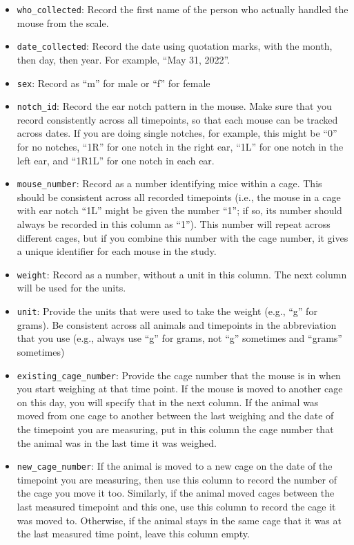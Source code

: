 \documentclass[
]{book}
\providecommand{\tightlist}{%
  \setlength{\itemsep}{0pt}\setlength{\parskip}{0pt}}
\begin{document}
\begin{itemize}
\tightlist
\item
  \texttt{who\_collected}: Record the first name of the person who actually handled the mouse from the scale.
\item
  \texttt{date\_collected}: Record the date using quotation marks, with the month, then day, then year. For example, ``May 31, 2022''.
\item
  \texttt{sex}: Record as ``m'' for male or ``f'' for female
\item
  \texttt{notch\_id}: Record the ear notch pattern in the mouse. Make sure that you record consistently across all timepoints, so that each mouse can be tracked across dates. If you are doing single notches, for example, this might be ``0'' for no notches, ``1R'' for one notch in the right ear, ``1L'' for one notch in the left ear, and ``1R1L'' for one notch in each ear.
\item
  \texttt{mouse\_number}: Record as a number identifying mice within a cage. This should be consistent across all recorded timepoints (i.e., the mouse in a cage with ear notch ``1L'' might be given the number ``1''; if so, its number should always be recorded in this column as ``1''). This number will repeat across different cages, but if you combine this number with the cage number, it gives a unique identifier for each mouse in the study.
\item
  \texttt{weight}: Record as a number, without a unit in this column. The next column will be used for the units.\\
\item
  \texttt{unit}: Provide the units that were used to take the weight (e.g., ``g'' for grams). Be consistent across all animals and timepoints in the abbreviation that you use (e.g., always use ``g'' for grams, not ``g'' sometimes and ``grams'' sometimes)
\item
  \texttt{existing\_cage\_number}: Provide the cage number that the mouse is in when you start weighing at that time point. If the mouse is moved to another cage on this day, you will specify that in the next column. If the animal was moved from one cage to another between the last weighing and the date of the timepoint you are measuring, put in this column the cage number that the animal was in the last time it was weighed.
\item
  \texttt{new\_cage\_number}: If the animal is moved to a new cage on the date of the timepoint you are measuring, then use this column to record the number of the cage you move it too. Similarly, if the animal moved cages between the last measured timepoint and this one, use this column to record the cage it was moved to. Otherwise, if the animal stays in the same cage that it was at the last measured time point, leave this column empty.

\end{itemize}
\end{document}
